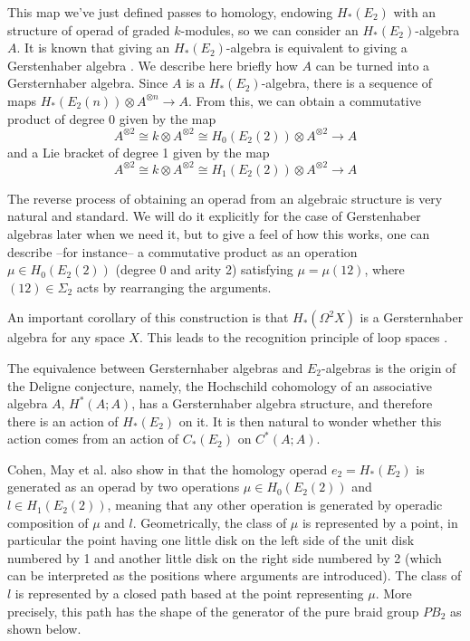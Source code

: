 \documentclass[TFM.tex]{subfiles}
\begin{document}
This map we've just defined passes to homology, endowing $H_*(E_2)$ with an structure of operad of graded $k$-modules, so we can consider an $H_*(E_2)$-algebra $A$. It is known that giving an $H_*(E_2)$-algebra is equivalent to giving a Gerstenhaber algebra \cite{cuentas}. We describe here briefly how $A$ can be turned into a Gersternhaber algebra. Since $A$ is a $H_*(E_2)$-algebra, there is a sequence of maps $H_*(E_2(n))\otimes A^{\otimes n}\to A$. From this, we can obtain a commutative product of degree 0 given by the map
\[
A^{\otimes 2}\cong k\otimes A^{\otimes 2}\cong H_0(E_2(2))\otimes A^{\otimes 2}\to A
\]
and a Lie bracket of degree 1 given by the map
\[
A^{\otimes 2}\cong k\otimes A^{\otimes 2}\cong H_1(E_2(2))\otimes A^{\otimes 2}\to A
\]

The reverse process of obtaining an operad from an algebraic structure is very natural and standard. We will do it explicitly for the case of Gerstenhaber algebras later when we need it, but to give a feel of how this works, one can describe --for instance-- a commutative product as an operation $\mu\in H_0(E_2(2))$ (degree 0 and arity 2) satisfying $\mu=\mu(12)$, where $(12)\in\Sigma_2$ acts by rearranging the arguments. 

An important corollary of this construction is that $H_*(\Omega^2 X)$ is a Gersternhaber algebra for any space $X$. This leads to the recognition principle of loop spaces \cite{May}.

The equivalence between Gersternhaber algebras and $E_2$-algebras is the origin of the Deligne conjecture, namely, the Hochschild cohomology of an associative algebra $A$, $H^*(A;A)$, has a Gersternhaber algebra structure, and therefore there is an action of $H_*(E_2)$ on it. It is then natural to wonder whether this action comes from an action of $C_*(E_2)$ on $C^*(A;A)$. 

Cohen, May et al. also show in \cite{cuentas} that the homology operad $e_2=H_*(E_2)$ is generated as an operad by two operations $\mu\in H_0(E_2(2))$ and $l\in H_1(E_2(2))$, meaning that any other operation is generated by operadic composition of $\mu$ and $l$. Geometrically, the class of $\mu$ is represented by a point, in particular the point having one little disk on the left side of the unit disk numbered by 1 and another little disk on the right side numbered by 2 (which can be interpreted as the positions where arguments are introduced). The class of $l$ is represented by a closed path based at the point representing $\mu$. More precisely, this path has the shape of the generator of the pure braid group $PB_2$ as shown below.
\end{document}
